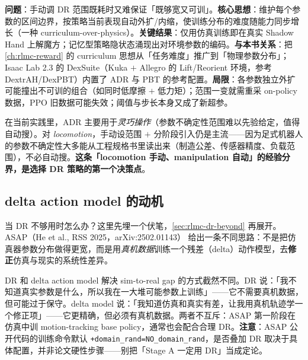 \begin{paper}\label{paper:rlmc-dr-adr}
\textbf{问题}：手动调 DR 范围既耗时又难保证「既够宽又可训」。\textbf{核心思想}：维护每个参数的区间边界，按策略当前表现自动外扩/内缩，使训练分布的难度随能力同步增长（一种 curriculum-over-physics）。\textbf{关键结果}：仅用仿真训练即在真实 Shadow Hand 上解魔方；记忆型策略隐状态涌现出对环境参数的编码。\textbf{与本书关系}：把 \cref{ch:rlmc-reward} 的 curriculum 思想从「任务难度」推广到「物理参数分布」；Isaac Lab 2.3 的 DexSuite（Kuka $+$ Allegro 的 Lift/Reorient 环境，参考 DextrAH/DexPBT）内置了 ADR 与 PBT 的参考配置\cite{mittal2025isaaclab}。\textbf{局限}：各参数独立外扩可能撞出不可训的组合（如同时低摩擦 $+$ 低力矩）；范围一变就需重采 on-policy 数据，PPO 旧数据可能失效；阈值与步长本身又成了新超参。
\end{paper}

在当前实践里，ADR 主要用于\emph{灵巧操作}（参数不确定性范围难以先验给定，值得自动搜）。对 \emph{locomotion}，手动设范围 $+$ 分阶段引入仍是主流——因为足式机器人的参数不确定性大多能从工程规格书里读出来（制造公差、传感器精度、负载范围），不必自动搜。\textbf{这条「locomotion 手动、manipulation 自动」的经验分界，是选择 DR 策略的第一个决策点}。

\subsection{delta action model 的动机}
\label{sec:rlmc-dr-delta-motivation}

当 DR 不够用时怎么办？这里先埋一个伏笔，\cref{sec:rlmc-dr-beyond} 再展开。ASAP（He et al., RSS 2025，arXiv:2502.01143）\cite{asap2025} 给出一条不同思路：不是把仿真器参数分布做得更宽，而是用\emph{真机数据}训练一个残差（delta）动作模型，去\textbf{修正}仿真与现实的系统性差异。

\begin{insight}\label{ins:rlmc-dr-vs-delta}
DR 和 delta action model 解决 sim-to-real gap 的方式截然不同。DR 说：「我不知道真实参数是什么，所以我在一大堆可能参数上训练」——它不需要真机数据，但可能过于保守。delta model 说：「我知道仿真和真实有差，让我用真机轨迹学一个修正项」——它更精确，但必须有真机数据。两者不互斥：ASAP 第一阶段在仿真中训 motion-tracking base policy，通常也会配合合理 DR。\textbf{注意}：ASAP 公开代码的训练命令默认 \verb|+domain_rand=NO_domain_rand|，是否叠加 DR 取决于具体配置，并非论文硬性步骤——别把「Stage A 一定用 DR」当成定论。
\end{insight}

